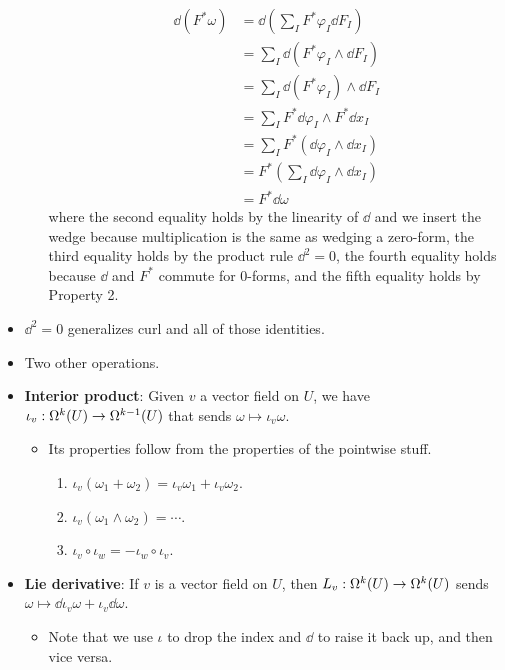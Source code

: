 \documentclass[../notes.tex]{subfiles}
\begin{document}
\begin{itemize}
\begin{itemize}
        \begin{align*}
            \dd(F^*\omega) &= \dd(\sum_IF^*\varphi_I\dd{F_I})\\
            &= \sum_I\dd(F^*\varphi_I\wedge\dd{F_I})\\
            &= \sum_I\dd(F^*\varphi_I)\wedge\dd{F_I}\\
            &= \sum_IF^*\dd{\varphi_I}\wedge F^*\dd{x_I}\\
            &= \sum_IF^*(\dd{\varphi_I}\wedge\dd{x_I})\\
            &= F^*\left( \sum_I\dd{\varphi_I}\wedge\dd{x_I} \right)\\
            &= F^*\dd{\omega}
        \end{align*}
        where the second equality holds by the linearity of $\dd$ and we insert the wedge because multiplication is the same as wedging a zero-form, the third equality holds by the product rule $\dd^2=0$, the fourth equality holds because $\dd$ and $F^*$ commute for 0-forms, and the fifth equality holds by Property 2.
    \end{itemize}
    \item $\dd^2=0$ generalizes curl and all of those identities.
    \item Two other operations.
    \item \textbf{Interior product}: Given $v$ a vector field on $U$, we have $\iota_v:\ome[k]{U}\to\ome[k-1]{U}$ that sends $\omega\mapsto\iota_v\omega$.
    \begin{itemize}
        \item Its properties follow from the properties of the pointwise stuff.
        \begin{enumerate}
            \item $\iota_v(\omega_1+\omega_2)=\iota_v\omega_1+\iota_v\omega_2$.
            \item $\iota_v(\omega_1\wedge\omega_2)=\cdots$.
            \item $\iota_v\circ\iota_w=-\iota_w\circ\iota_v$.
        \end{enumerate}
    \end{itemize}
    \item \textbf{Lie derivative}: If $v$ is a vector field on $U$, then $L_v:\ome[k]{U}\to\ome[k]{U}$ sends $\omega\mapsto\dd{\iota_v\omega}+\iota_v\dd{\omega}$.
    \begin{itemize}
        \item Note that we use $\iota$ to drop the index and $\dd$ to raise it back up, and then vice versa.

\end{itemize}
\end{itemize}
\end{document}
